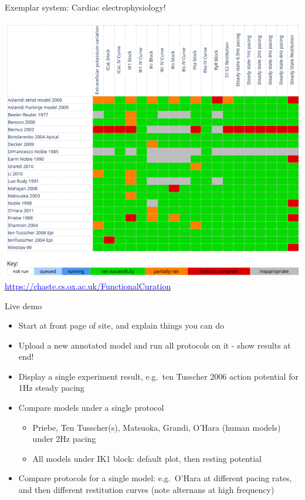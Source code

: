 \documentclass[t,xcolor={usenames,dvipsnames}]{beamer}
\newcommand{\myhref}[2]{\href{#1}{\textcolor{Blue}{#2}}}
\newcommand{\myurl}[1]{\myhref{#1}{#1}}
\begin{document}
\begin{frame}{Exemplar system: Cardiac electrophysiology!}
\begin{center}
\vspace{-.5cm}
\includegraphics[height=.8\textheight]{cardiac_fc_matrix}\\
\myurl{https://chaste.cs.ox.ac.uk/FunctionalCuration}
\end{center}
\end{frame}


\begin{frame}{Live demo}
\begin{itemize}
\item Start at front page of site, and explain things you can do
\item Upload a new annotated model and run all protocols on it - show results at end!
\item Display a single experiment result, e.g.\ ten Tusscher 2006 action potential for 1Hz steady pacing
\item Compare models under a single protocol
  \begin{itemize}
  \item Priebe, Ten Tusscher(s), Matsuoka, Grandi, O'Hara (human models) under 2Hz pacing
  \item All models under IK1 block: default plot, then resting potential
  \end{itemize}
\item Compare protocols for a single model: e.g.\ O'Hara at different pacing rates, and then different restitution curves (note alternans at high frequency)
\end{itemize}
\end{frame}
\end{document}
